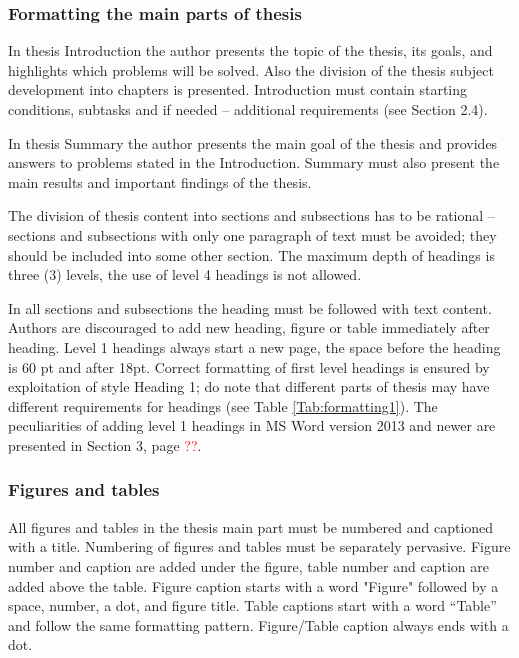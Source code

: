 \subsubsection{Formatting the main parts of thesis}

In thesis Introduction the author presents the topic of the thesis,
its goals, and highlights which problems will be solved. Also the
division of the thesis subject development into chapters is
presented. Introduction must contain starting conditions, subtasks and
if needed -- additional requirements (see Section 2.4).

In thesis Summary the author presents the main goal of the thesis and
provides answers to problems stated in the Introduction. Summary must
also present the main results and important findings of the thesis.

The division of thesis content into sections and subsections has to be
rational – sections and subsections with only one paragraph of text
must be avoided; they should be included into some other section. The
maximum depth of headings is three (3) levels, the use of level 4
headings is not allowed.

In all sections and subsections the heading must be followed with text
content. Authors are discouraged to add new heading, figure or table
immediately after heading. Level 1 headings always start a new page,
the space before the heading is 60 pt and after 18pt. Correct
formatting of first level headings is ensured by exploitation of style
Heading 1; do note that different parts of thesis may have different
requirements for headings (see Table \ref{Tab:formatting1}). The
peculiarities of adding level 1 headings in MS Word version 2013 and
newer are presented in Section 3, page \textcolor{red}{??}.


\subsubsection{Figures and tables}
All figures and tables in the thesis main part must be numbered and
captioned with a title.  Numbering of figures and tables must be
separately pervasive. Figure number and caption are added under the
figure, table number and caption are added above the table. Figure
caption starts with a word "Figure" followed by a space, number, a
dot, and figure title.  Table captions start with a word “Table” and
follow the same formatting pattern. Figure/Table caption always ends
with a dot.



